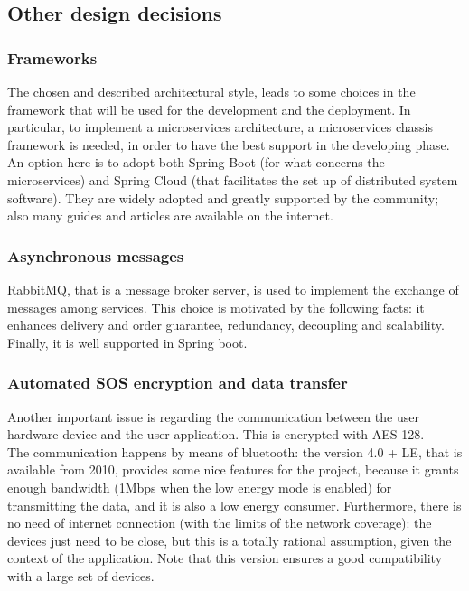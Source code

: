 \subsection{Other design decisions}
\subsubsection{Frameworks}
The chosen and described architectural style, leads to some choices in the framework that will be used for the development and the deployment. 
In particular, to implement a microservices architecture, a microservices chassis framework is needed, in order to have the best support 
in the developing phase. 
An option here is to adopt both Spring Boot (for what concerns the microservices) and Spring Cloud (that facilitates the set up of distributed
system software). They are widely adopted and greatly supported by the community; also many guides and articles are available on the internet. \\

\subsubsection{Asynchronous messages}
RabbitMQ, that is a message broker server, is used to implement the exchange of messages among services. This choice is motivated 
by the following facts: it enhances delivery and order guarantee, redundancy, decoupling and scalability. 
Finally, it is well supported in Spring boot. 

\subsubsection{Automated SOS encryption and data transfer}
Another important issue is regarding the communication between the user hardware device and the user application. This is encrypted with
AES-128. \\
The communication happens by means of bluetooth: the version 4.0 + LE, that is available from 2010, provides some nice features for the
project, because it grants enough bandwidth (1Mbps when the low energy mode is enabled) for transmitting the data, and it is also a low
energy consumer. Furthermore, there is no need of internet connection (with the limits of the network coverage): the devices just need to be
close, but this is a totally rational assumption, given the context of the application. 
Note that this version ensures a good compatibility with a large set of devices. 

